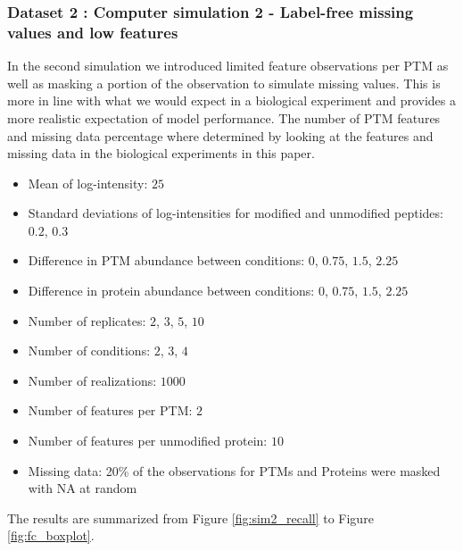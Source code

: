 \documentclass{mcp}
\begin{document}
\subsubsection{Dataset 2 : Computer simulation 2 - Label-free missing values and low features}
\label{sec:dataset2}

In the second simulation we introduced limited feature observations per PTM as well as masking a portion of the observation to simulate missing values. This is more in line with what we would expect in a biological experiment and provides a more realistic expectation of model performance. The number of PTM features and missing data percentage where determined by looking at the features and missing data in the biological experiments in this paper.

\begin{itemize}
\item Mean of log-intensity: $25$
\item Standard deviations of log-intensities for modified and unmodified peptides: $0.2$, $0.3$
\item Difference in PTM abundance between conditions: $0$, $0.75$, $1.5$, $2.25$
\item Difference in protein abundance between conditions: $0$, $0.75$, $1.5$, $2.25$
\item Number of replicates: $2$, $3$, $5$, $10$
\item Number of conditions: $2$, $3$, $4$
\item Number of realizations: $1000$
\item Number of features per PTM: $2$
\item Number of features per unmodified protein: $10$
\item Missing data: 20\% of the observations for PTMs and Proteins were masked with NA at random
\end{itemize}

The results are summarized from Figure \ref{fig:sim2_recall} to Figure \ref{fig:fc_boxplot}.
\end{document}
